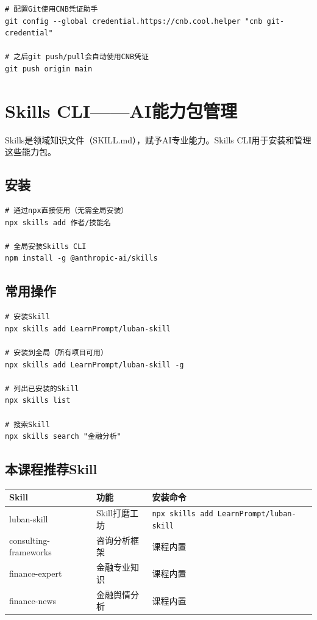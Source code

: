 \begin{lstlisting}[style=shell]
# 配置Git使用CNB凭证助手
git config --global credential.https://cnb.cool.helper "cnb git-credential"

# 之后git push/pull会自动使用CNB凭证
git push origin main
\end{lstlisting}

\section{Skills CLI——AI能力包管理}

Skills是领域知识文件（SKILL.md），赋予AI专业能力。Skills CLI用于安装和管理这些能力包。

\subsection{安装}

\begin{lstlisting}[style=shell]
# 通过npx直接使用（无需全局安装）
npx skills add 作者/技能名

# 全局安装Skills CLI
npm install -g @anthropic-ai/skills
\end{lstlisting}

\subsection{常用操作}

\begin{lstlisting}[style=shell]
# 安装Skill
npx skills add LearnPrompt/luban-skill

# 安装到全局（所有项目可用）
npx skills add LearnPrompt/luban-skill -g

# 列出已安装的Skill
npx skills list

# 搜索Skill
npx skills search "金融分析"
\end{lstlisting}

\subsection{本课程推荐Skill}

\begin{table}[H]
\centering
\begin{tabular}{lll}
\toprule
\textbf{Skill} & \textbf{功能} & \textbf{安装命令} \\
\midrule
luban-skill & Skill打磨工坊 & \texttt{npx skills add LearnPrompt/luban-skill} \\
consulting-frameworks & 咨询分析框架 & 课程内置 \\
finance-expert & 金融专业知识 & 课程内置 \\
finance-news & 金融舆情分析 & 课程内置 \\
\bottomrule
\end{tabular}
\end{table}

